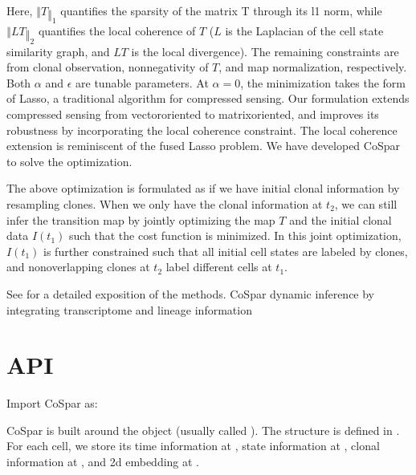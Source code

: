 \documentclass[letterpaper,10pt,english]{sphinxmanual}
\begin{document}
Here, \(‖T‖_1\) quantifies the sparsity of the matrix T through its l\sphinxhyphen{}1 norm, while  \(‖LT‖_2\) quantifies the local coherence of \(T\) (\(L\) is the Laplacian of the cell state similarity graph, and \(LT\) is the local divergence). The remaining constraints are from clonal observation, non\sphinxhyphen{}negativity of \(T\), and map normalization, respectively. Both \(\alpha\) and \(\epsilon\) are tunable parameters.  At \(\alpha=0\), the minimization takes the form of Lasso, a traditional algorithm for compressed sensing. Our formulation extends compressed sensing from vector\sphinxhyphen{}oriented to matrix\sphinxhyphen{}oriented, and improves its robustness by incorporating the local coherence constraint. The local coherence extension is reminiscent of the fused Lasso problem. We have developed CoSpar to solve the optimization.

The above optimization is formulated as if we have initial clonal information by re\sphinxhyphen{}sampling clones. When we only have the clonal information at \(t_2\), we can still infer the transition map by jointly optimizing the map \(T\) and the initial clonal data \(I(t_1)\) such that the cost function is minimized. In this joint optimization, \(I(t_1 )\) is further constrained such that all initial cell states are labeled by clones, and non\sphinxhyphen{}overlapping clones at \(t_2\) label different cells at \(t_1\).

See  for a detailed exposition of the methods.
\label{\detokenize{api:module-cospar}}
CoSpar \sphinxhyphen{} dynamic inference by integrating transcriptome and lineage information


\section{API}
\label{\detokenize{api:api}}\label{\detokenize{api::doc}}
Import CoSpar as:

\begin{sphinxVerbatim}[commandchars=\\\{\}]
   
\end{sphinxVerbatim}

CoSpar is built around the  object (usually called ).
The structure is defined in {\hyperref[\detokenize{cospar.pp.initialize_adata_object:cospar.pp.initialize_adata_object}]{}}. For each cell,
we store its time information at , state information
at ,  clonal information at ,
and 2\sphinxhyphen{}d embedding at .
\end{document}
